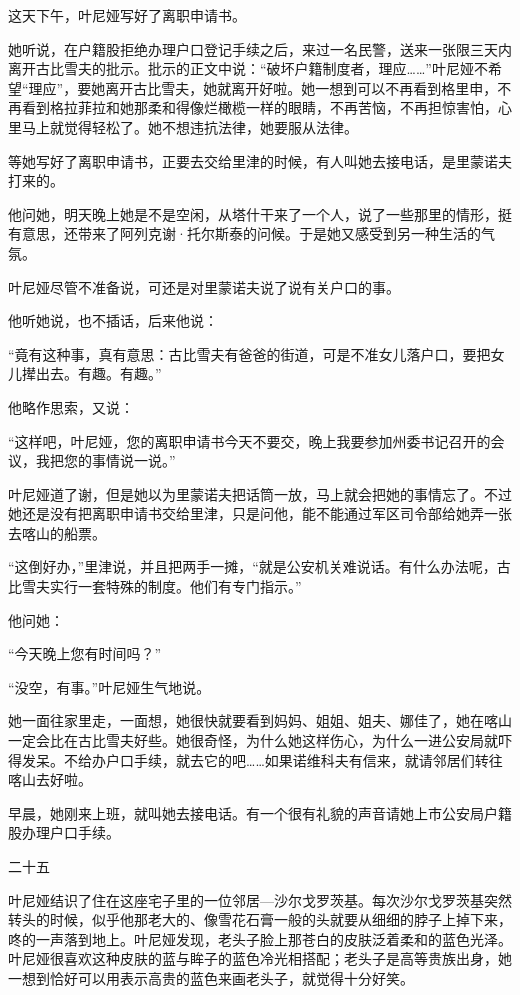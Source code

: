 这天下午，叶尼娅写好了离职申请书。

她听说，在户籍股拒绝办理户口登记手续之后，来过一名民警，送来一张限三天内离开古比雪夫的批示。批示的正文中说：“破坏户籍制度者，理应……”叶尼娅不希望“理应”，要她离开古比雪夫，她就离开好啦。她一想到可以不再看到格里申，不再看到格拉菲拉和她那柔和得像烂橄榄一样的眼睛，不再苦恼，不再担惊害怕，心里马上就觉得轻松了。她不想违抗法律，她要服从法律。

等她写好了离职申请书，正要去交给里津的时候，有人叫她去接电话，是里蒙诺夫打来的。

他问她，明天晚上她是不是空闲，从塔什干来了一个人，说了一些那里的情形，挺有意思，还带来了阿列克谢·托尔斯泰的问候。于是她又感受到另一种生活的气氛。

叶尼娅尽管不准备说，可还是对里蒙诺夫说了说有关户口的事。

他听她说，也不插话，后来他说：

“竟有这种事，真有意思：古比雪夫有爸爸的街道，可是不准女儿落户口，要把女儿撵出去。有趣。有趣。”

他略作思索，又说：

“这样吧，叶尼娅，您的离职申请书今天不要交，晚上我要参加州委书记召开的会议，我把您的事情说一说。”

叶尼娅道了谢，但是她以为里蒙诺夫把话筒一放，马上就会把她的事情忘了。不过她还是没有把离职申请书交给里津，只是问他，能不能通过军区司令部给她弄一张去喀山的船票。

“这倒好办，”里津说，并且把两手一摊，“就是公安机关难说话。有什么办法呢，古比雪夫实行一套特殊的制度。他们有专门指示。”

他问她：

“今天晚上您有时间吗？”

“没空，有事。”叶尼娅生气地说。

她一面往家里走，一面想，她很快就要看到妈妈、姐姐、姐夫、娜佳了，她在喀山一定会比在古比雪夫好些。她很奇怪，为什么她这样伤心，为什么一进公安局就吓得发呆。不给办户口手续，就去它的吧……如果诺维科夫有信来，就请邻居们转往喀山去好啦。

早晨，她刚来上班，就叫她去接电话。有一个很有礼貌的声音请她上市公安局户籍股办理户口手续。

二十五

叶尼娅结识了住在这座宅子里的一位邻居—沙尔戈罗茨基。每次沙尔戈罗茨基突然转头的时候，似乎他那老大的、像雪花石膏一般的头就要从细细的脖子上掉下来，咚的一声落到地上。叶尼娅发现，老头子脸上那苍白的皮肤泛着柔和的蓝色光泽。叶尼娅很喜欢这种皮肤的蓝与眸子的蓝色冷光相搭配；老头子是高等贵族出身，她一想到恰好可以用表示高贵的蓝色来画老头子，就觉得十分好笑。

